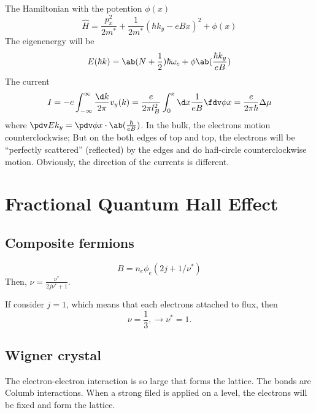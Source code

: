 The Hamiltonian with the potention $\phi(x)$
\begin{equation}
  \hat H = \frac{p_x^2}{2m^*} + \frac1{2m^*}(\hbar k_y - eBx)^2 + \phi(x)
\end{equation}
The eigenenergy will be
\[
  E(\hbar k) = \ab(N + \frac12)\hbar\omega_c + \phi\ab(\frac{\hbar k_y}{eB})
\]
The current
\[
  I = -e \int_{-\infty}^\infty \frac{\d k}{2\pi} v_y(k)
= \frac{e}{2\pi l_B^2} \int_0^x \d x \frac1{eB} \fdv\phi x
= \frac e{2\pi\hbar} \Delta\mu
\]
where $\pdv E{k_y} = \pdv\phi x \cdot \ab(\frac\hbar{eB})$.
In the bulk, the electrons motion counterclockwise; But on the both edges
of top and top, the electrons will be ``perfectly scattered'' (reflected) by the
edges and do hafl-circle counterclockwise motion.
Obviously, the direction of the currents is different.

\section{Fractional Quantum Hall Effect}

\subsection{Composite fermions}

\[
  B = n_e\phi_e (2j + 1/\nu^*)
\]
Then, $\nu = \frac{\nu^*}{2j\nu^* + 1}$.

If consider $j = 1$, which means that each electrons attached to flux, then
\[
  \nu = \frac13, \rightarrow \nu^* = 1.
\]

\subsection{Wigner crystal}

The electron-electron interaction is so large that forms the lattice.
The bonds are Columb interactions.
When a strong filed is applied on a level, the electrons will be fixed and form
the lattice.